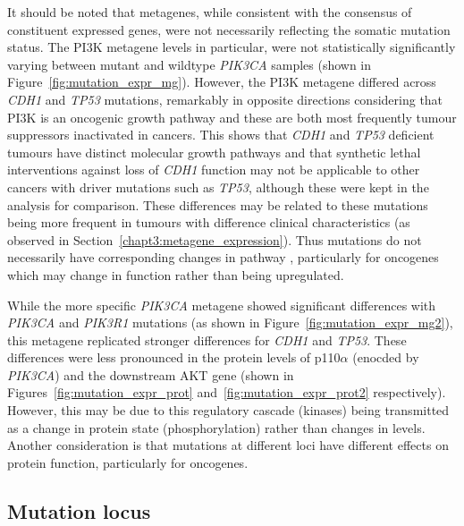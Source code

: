 It should be noted that \glspl{metagene}, while consistent with the consensus of constituent expressed genes, were not necessarily reflecting the \gls{somatic} \gls{mutation} status. The \gls{PI3K} \citep{Gatza2011} \gls{metagene} levels in particular, were not statistically significantly varying between \gls{mutant} and wildtype \textit{PIK3CA} samples (shown in Figure~\ref{fig:mutation_expr_mg}). However, the \gls{PI3K} \gls{metagene} differed across \textit{CDH1} and \textit{TP53} \glspl{mutation}, remarkably in opposite directions considering that \gls{PI3K} is an oncogenic growth pathway and these are both most frequently \glspl{tumour suppressor} inactivated in cancers. This shows that \textit{CDH1} and \textit{TP53} deficient tumours have distinct molecular growth pathways and that \gls{synthetic lethal} interventions against loss of \textit{CDH1} function may not be applicable to other cancers with \glspl{driver mutation} such as \textit{TP53}, although these were kept in the analysis for comparison. These differences may be related to these \glspl{mutation} being more frequent in tumours with difference clinical characteristics (as observed in Section~\ref{chapt3:metagene_expression}).  Thus \glspl{mutation} do not necessarily have corresponding changes in pathway , particularly for \glspl{oncogene} which may change in function rather than being upregulated.


While the more specific \textit{PIK3CA} \citep{Gatza2014} \gls{metagene} showed significant differences with \textit{PIK3CA} and \textit{PIK3R1} \glspl{mutation} (as shown in Figure~\ref{fig:mutation_expr_mg2}), this \gls{metagene} replicated stronger differences for \textit{CDH1} and \textit{TP53}.  These differences were less pronounced in the protein levels of p110$\alpha$ (enocded by \textit{PIK3CA}) and the downstream AKT gene (shown in Figures~\ref{fig:mutation_expr_prot} and~\ref{fig:mutation_expr_prot2} respectively). However, this may be due to this regulatory cascade (kinases) being transmitted as a change in protein state (phosphorylation) rather than changes in  levels. Another consideration is that \glspl{mutation} at different loci have different effects on protein function, particularly for \glspl{oncogene}.

\FloatBarrier

\iffalse
\subsection{Mutation locus}  \label{chapt3:metagene_mut_locus}

